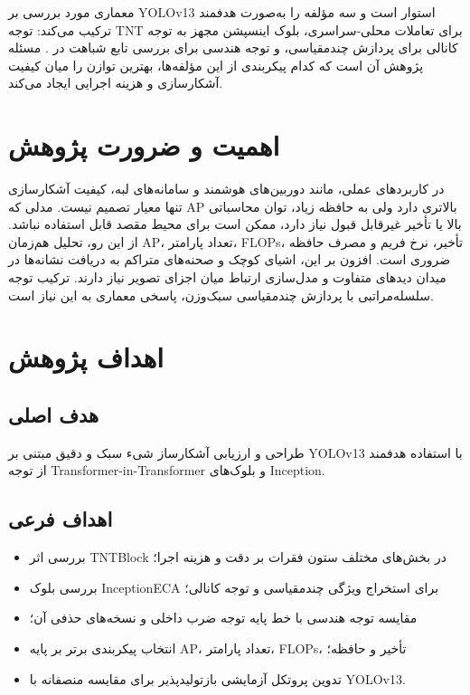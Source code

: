 معماری مورد بررسی بر YOLOv13 استوار است و سه مؤلفه را به‌صورت هدفمند ترکیب می‌کند: توجه TNT برای تعاملات محلی-سراسری، بلوک اینسپشن مجهز به توجه کانالی برای پردازش چندمقیاسی، و توجه هندسی برای بررسی تابع شباهت در . مسئله پژوهش آن است که کدام پیکربندی از این مؤلفه‌ها، بهترین توازن را میان کیفیت آشکارسازی و هزینه اجرایی ایجاد می‌کند.

\section{اهمیت و ضرورت پژوهش}
در کاربردهای عملی، مانند دوربین‌های هوشمند و سامانه‌های لبه، کیفیت آشکارسازی تنها معیار تصمیم نیست. مدلی که AP بالاتری دارد ولی به حافظه زیاد، توان محاسباتی بالا یا تأخیر غیرقابل قبول نیاز دارد، ممکن است برای محیط مقصد قابل استفاده نباشد. از این رو، تحلیل هم‌زمان AP، تعداد پارامتر، FLOPs، تأخیر، نرخ فریم و مصرف حافظه ضروری است. افزون بر این، اشیای کوچک و صحنه‌های متراکم به دریافت نشانه‌ها در میدان دیدهای متفاوت و مدل‌سازی ارتباط میان اجزای تصویر نیاز دارند. ترکیب توجه سلسله‌مراتبی با پردازش چندمقیاسی سبک‌وزن، پاسخی معماری به این نیاز است.

\section{اهداف پژوهش}
\subsection{هدف اصلی}
طراحی و ارزیابی آشکارساز شیء سبک و دقیق مبتنی بر YOLOv13 با استفاده هدفمند از توجه Transformer-in-Transformer و بلوک‌های Inception.

\subsection{اهداف فرعی}
\begin{itemize}
  \item بررسی اثر TNTBlock در بخش‌های مختلف ستون فقرات بر دقت و هزینه اجرا؛
  \item بررسی بلوک InceptionECA برای استخراج ویژگی چندمقیاسی و توجه کانالی؛
  \item مقایسه توجه هندسی با خط پایه توجه ضرب داخلی و نسخه‌های حذفی آن؛
  \item انتخاب پیکربندی برتر بر پایه AP، تعداد پارامتر، FLOPs، تأخیر و حافظه؛
  \item تدوین پروتکل آزمایشی بازتولیدپذیر برای مقایسه منصفانه با YOLOv13.
\end{itemize}

